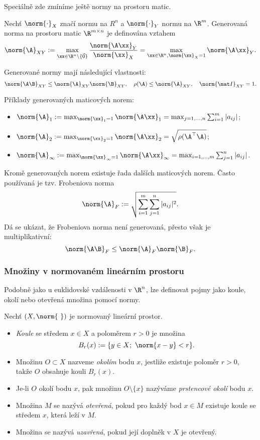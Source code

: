 Speciálně zde zmíníme ještě normy na prostoru matic.
\begin{df}
Nechť $\norm{\cdot}_X$ značí normu na $R^n$ a $\norm{\cdot}_Y$ normu na $\R^m$.
Generovaná norma na prostoru matic $\R^{m\times n}$  je definována vztahem
\[ \norm{\A}_{XY} := \max_{\xx\in\R^n\setminus\{\vec 0\}}\frac{\norm{\A\xx}_Y}{\norm{\xx}_X} = \max_{\xx\in\R^n,\norm{\xx}_X=1}\norm{\A\xx}_Y. \]
\end{df}
Generované normy mají následující vlastnosti:
\[ \norm{\A\B}_{XY} \le \norm{\A}_{XY}\norm{\B}_{XY},\quad \rho(\A)\le\norm{\A}_{XY},\quad \norm{\mat I}_{XY}=1. \]
\begin{ex}
Příklady generovaných maticových norem:
\begin{itemize}
\item $\norm{\A}_1:=\max_{\norm{\xx}_1=1}\norm{\A\xx}_1 = \max_{j=1,\ldots,n}\sum_{i=1}^m|a_{ij}|$;
\item $\norm{\A}_2:=\max_{\norm{\xx}_2=1}\norm{\A\xx}_2 = \sqrt{\rho(\A^\top\A)}$;
\item $\norm{\A}_\infty:=\max_{\norm{\xx}_\infty=1}\norm{\A\xx}_\infty = \max_{i=1,\ldots,m}\sum_{j=1}^n|a_{ij}|$.
\end{itemize}
\end{ex}
Kromě generovaných norem existuje řada dalších maticových norem.
Často používaná je tzv. Frobeniova norma
\[ \norm{\A}_F:=\sqrt{\sum_{i=1}^m\sum_{j=1}^n|a_{ij}|^2}. \]
Dá se ukázat, že Frobeniova norma není generovaná, přesto však je multiplikativní:
\[ \norm{\A\B}_F \le \norm{\A}_F\norm{\B}_F. \]



\subsubsection{Množiny v normovaném lineárním prostoru}
% 
Podobně jako u euklidovské vzdálenosti v $\R^n$, lze definovat pojmy jako koule, okolí nebo otevřená množina pomocí normy.
\begin{df}
Nechť $(X,\norm{\ })$ je normovaný lineární prostor.
\begin{itemize}
\item \emph{Koule} se středem $x\in X$ a poloměrem $r>0$ je množina
\[ B_r(x) := \{y\in X;~\norm{x-y}<r\}. \]
\item Množinu $O\subset X$ nazveme \emph{okolím} bodu $x$, jestliže existuje poloměr $r>0$, takže $O$ obsahuje kouli $B_r(x)$.
\item Je-li $O$ okolí bodu $x$, pak množinu $O\setminus\{x\}$ nazýváme \emph{prstencové okolí} bodu $x$.
\item Množina $M$ se nazývá \emph{otevřená}, pokud pro každý bod $x\in M$ existuje koule se středem $x$, která leží v $M$.
\item Množina se nazývá \emph{uzavřená}, pokud její doplněk v $X$ je otevřený.
\end{itemize}
\end{df}


